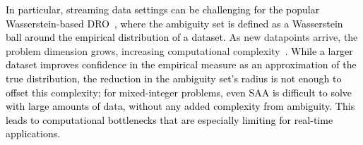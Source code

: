 \documentclass[12pt]{article}
\newcommand{\bnote}[1]{\textcolor{purple}{\textbf{[B: #1]}}}
\newcommand{\epsnom}{\varepsilon}
\newcommand{\RC}[1]{\textcolor{black}{#1}}
\newcommand{\RC}[1]{\textcolor{blue}{#1}}
\begin{document}
\RC{In particular, streaming data settings can be challenging for the popular Wasserstein-based \gls{DRO}~\cite{mohajerin2018data,kuhn2019wasserstein,gao2016distributionally}, where the ambiguity set is defined as a Wasserstein ball around the empirical distribution of a dataset.}
As new datapoints arrive, the problem dimension grows, increasing computational complexity~\cite{kuhn2019wasserstein,mro}.
\RC{While a larger dataset improves confidence in the empirical measure as an approximation of the true distribution, the reduction in the ambiguity set’s radius is not enough to offset this complexity; for mixed-integer problems, even \gls{SAA} is difficult to solve with large amounts of data, without any added complexity from ambiguity. This leads to computational bottlenecks that are especially limiting for real-time applications.}






\end{document}
